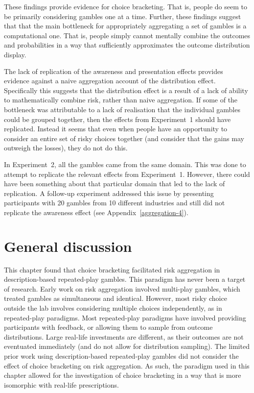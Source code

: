 \documentclass[a4paper, nobind, dvipsnames]{templates/ociamthesis}
\theoremstyle{definition}
\theoremstyle{definition}
\theoremstyle{definition}
\theoremstyle{definition}
\theoremstyle{remark}
\begin{document}
These findings provide evidence for choice bracketing. That is, people do seem
to be primarily considering gambles one at a time. Further, these findings
suggest that that the main bottleneck for appropriately aggregating a set of
gambles is a computational one. That is, people simply cannot mentally combine
the outcomes and probabilities in a way that sufficiently approximates the
outcome distribution display.

The lack of replication of the awareness and presentation effects provides
evidence against a naive aggregation account of the distribution effect.
Specifically this suggests that the distribution effect is a result of a lack of
ability to mathematically combine risk, rather than naive aggregation. If some
of the bottleneck was attributable to a lack of realisation that the individual
gambles could be grouped together, then the effects from Experiment~1 should
have replicated. Instead it seems that even when people have an opportunity to
consider an entire set of risky choices together (and consider that the gains
may outweigh the losses), they do not do this.

In Experiment~2, all the gambles came from the same domain. This was done to
attempt to replicate the relevant effects from Experiment~1. However, there
could have been something about that particular domain that led to the lack of
replication. A follow-up experiment addressed this issue by presenting
participants with 20 gambles from 10 different industries and still did not
replicate the awareness effect (see Appendix~\ref{aggregation-4}).

\section{General discussion}

This chapter found that choice bracketing facilitated risk aggregation in
description-based repeated-play gambles. This paradigm has never been a target
of research. Early work on risk aggregation involved multi-play gambles, which
treated gambles as simultaneous and identical. However, most risky choice
outside the lab involves considering multiple choices independently, as in
repeated-play paradigms. Most repeated-play paradigms have involved providing
participants with feedback, or allowing them to sample from outcome
distributions. Large real-life investments are different, as their outcomes are
not eventuated immediately (and do not allow for distribution sampling). The
limited prior work using description-based repeated-play gambles did not
consider the effect of choice bracketing on risk aggregation. As such, the
paradigm used in this chapter allowed for the investigation of choice bracketing
in a way that is more isomorphic with real-life prescriptions.
\end{document}

